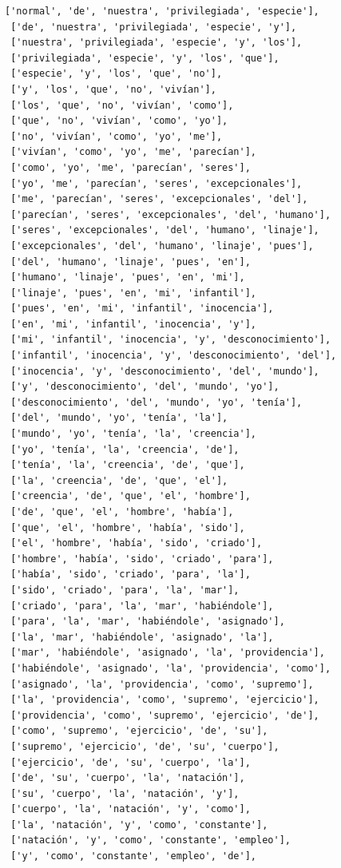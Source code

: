 \documentclass[11pt]{article}
\begin{document}
\begin{tcolorbox}[breakable, size=fbox, boxrule=1pt, pad at break*=1mm,colback=cellbackground, colframe=cellborder]
\begin{Verbatim}[commandchars=\\\{\}]
 ['normal', 'de', 'nuestra', 'privilegiada', 'especie'],
 ['de', 'nuestra', 'privilegiada', 'especie', 'y'],
 ['nuestra', 'privilegiada', 'especie', 'y', 'los'],
 ['privilegiada', 'especie', 'y', 'los', 'que'],
 ['especie', 'y', 'los', 'que', 'no'],
 ['y', 'los', 'que', 'no', 'vivían'],
 ['los', 'que', 'no', 'vivían', 'como'],
 ['que', 'no', 'vivían', 'como', 'yo'],
 ['no', 'vivían', 'como', 'yo', 'me'],
 ['vivían', 'como', 'yo', 'me', 'parecían'],
 ['como', 'yo', 'me', 'parecían', 'seres'],
 ['yo', 'me', 'parecían', 'seres', 'excepcionales'],
 ['me', 'parecían', 'seres', 'excepcionales', 'del'],
 ['parecían', 'seres', 'excepcionales', 'del', 'humano'],
 ['seres', 'excepcionales', 'del', 'humano', 'linaje'],
 ['excepcionales', 'del', 'humano', 'linaje', 'pues'],
 ['del', 'humano', 'linaje', 'pues', 'en'],
 ['humano', 'linaje', 'pues', 'en', 'mi'],
 ['linaje', 'pues', 'en', 'mi', 'infantil'],
 ['pues', 'en', 'mi', 'infantil', 'inocencia'],
 ['en', 'mi', 'infantil', 'inocencia', 'y'],
 ['mi', 'infantil', 'inocencia', 'y', 'desconocimiento'],
 ['infantil', 'inocencia', 'y', 'desconocimiento', 'del'],
 ['inocencia', 'y', 'desconocimiento', 'del', 'mundo'],
 ['y', 'desconocimiento', 'del', 'mundo', 'yo'],
 ['desconocimiento', 'del', 'mundo', 'yo', 'tenía'],
 ['del', 'mundo', 'yo', 'tenía', 'la'],
 ['mundo', 'yo', 'tenía', 'la', 'creencia'],
 ['yo', 'tenía', 'la', 'creencia', 'de'],
 ['tenía', 'la', 'creencia', 'de', 'que'],
 ['la', 'creencia', 'de', 'que', 'el'],
 ['creencia', 'de', 'que', 'el', 'hombre'],
 ['de', 'que', 'el', 'hombre', 'había'],
 ['que', 'el', 'hombre', 'había', 'sido'],
 ['el', 'hombre', 'había', 'sido', 'criado'],
 ['hombre', 'había', 'sido', 'criado', 'para'],
 ['había', 'sido', 'criado', 'para', 'la'],
 ['sido', 'criado', 'para', 'la', 'mar'],
 ['criado', 'para', 'la', 'mar', 'habiéndole'],
 ['para', 'la', 'mar', 'habiéndole', 'asignado'],
 ['la', 'mar', 'habiéndole', 'asignado', 'la'],
 ['mar', 'habiéndole', 'asignado', 'la', 'providencia'],
 ['habiéndole', 'asignado', 'la', 'providencia', 'como'],
 ['asignado', 'la', 'providencia', 'como', 'supremo'],
 ['la', 'providencia', 'como', 'supremo', 'ejercicio'],
 ['providencia', 'como', 'supremo', 'ejercicio', 'de'],
 ['como', 'supremo', 'ejercicio', 'de', 'su'],
 ['supremo', 'ejercicio', 'de', 'su', 'cuerpo'],
 ['ejercicio', 'de', 'su', 'cuerpo', 'la'],
 ['de', 'su', 'cuerpo', 'la', 'natación'],
 ['su', 'cuerpo', 'la', 'natación', 'y'],
 ['cuerpo', 'la', 'natación', 'y', 'como'],
 ['la', 'natación', 'y', 'como', 'constante'],
 ['natación', 'y', 'como', 'constante', 'empleo'],
 ['y', 'como', 'constante', 'empleo', 'de'],

\end{Verbatim}
\end{tcolorbox}
\end{document}
